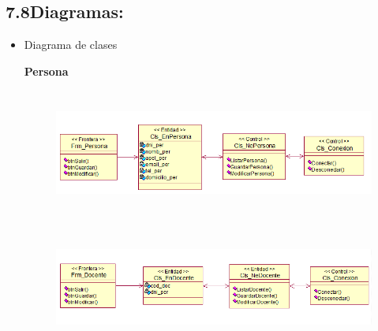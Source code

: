 \documentclass[12pt]{report}
\begin{document}
\subsection*{7.8\hspace*{10pt}Diagramas:}
\begin{itemize}
	\item {\fontsize{10pt}{12.0pt}\selectfont Diagrama de clases\par}\par

{\fontsize{10pt}{12.0pt}\selectfont \textbf{Persona}\par}\par




\begin{figure}[H]
	\begin{Center}
		\includegraphics[width=6.33in,height=1.65in]{./media/image9.png}
	\end{Center}
\end{figure}



\par




\newpage

\par




\begin{figure}[H]
	\begin{Center}
		\includegraphics[width=6.33in,height=1.51in]{./media/image10.png}
	\end{Center}
\end{figure}



\end{itemize}
\end{document}
